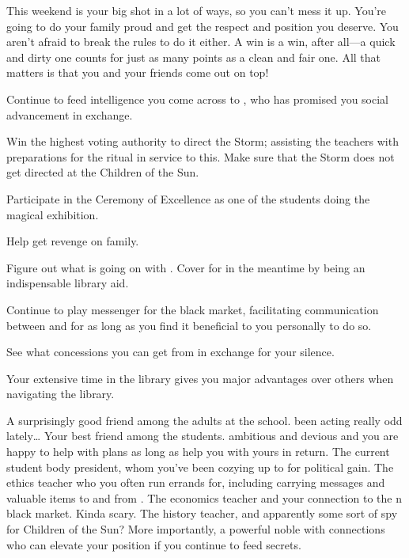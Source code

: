 \documentclass[char]{GL2020}
\begin{document}
This weekend is your big shot in a lot of ways, so you can't mess it up. You're going to do your family proud and get the respect and position you deserve. You aren't afraid to break the rules to do it either. A win is a win, after all---a quick and dirty one counts for just as many points as a clean and fair one. All that matters is that you and your friends come out on top!

\begin{itemz}
	\item Continue to feed intelligence you come across to \cHistory{}, who has promised you social advancement in exchange. 
	\item Win the highest voting authority to direct the Storm; assisting the teachers with preparations for the ritual in service to this. Make sure that the Storm does not get directed at the Children of the Sun.
	\item Participate in the Ceremony of Excellence as one of the students doing the magical exhibition.
	\item Help \cAdopted{} get revenge on \cAdopted{\their} family.
	\item Figure out what is going on with \cLibrarian{}. Cover for \cLibrarian{} in the meantime by being an indispensable library aid.
\item Continue to play messenger for the black market, facilitating communication between \cEthics{} and \cChupSecond{} for as long as you find it beneficial to you personally to do so.
	\item See what concessions you can get from \cInterpol{} in exchange for your silence.
\end{itemz}

\begin{itemz}[Notes]
	\item Your extensive time in the library gives you major advantages over others when navigating the library.
\end{itemz}

\begin{contacts}
	\contact{\cLibrarian{}} A surprisingly good friend among the adults at the school. \cLibrarian{\They} \cLibrarian{\have} been acting really odd lately\ldots{}
	\contact{\cAdopted{}} Your best friend among the students. \cAdopted{\Theyare} ambitious and devious and you are happy to help \cAdopted{\them} with \cAdopted{\their} plans as long as \cAdopted{\they} help\cAdopted{\plural} you with yours in return.
	\contact{\cPresident{}} The current student body president, whom you've been cozying up to for political gain.
	\contact{\cEthics{}} The ethics teacher who you often run errands for, including carrying messages and valuable items to and from \cChupSecond{}.
	\contact{\cChupSecond{}} The economics teacher and your connection to the \pEarth{}n black market. Kinda scary.
	\contact{\cHistory{}} The history teacher, and apparently some sort of spy for Children of the Sun? More importantly, a powerful noble with connections who can elevate your position if you continue to feed \cHistory{\them} secrets.
\end{contacts}
\end{document}

